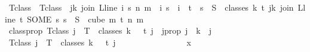\begin{isabellebody}
\ T{\isacharunderscore}{\kern0pt}class\ \ {\isachardoublequoteopen}T{\isacharunderscore}{\kern0pt}class\ {\isasymequiv}\ {\isacharparenleft}{\kern0pt}{\isasymlambda}j{\isasymin}{\isacharbraceleft}{\kern0pt}{\isachardot}{\kern0pt}{\isachardot}{\kern0pt}k{\isacharbraceright}{\kern0pt}{\isachardot}{\kern0pt}\ {\isacharbraceleft}{\kern0pt}join\ {\isacharparenleft}{\kern0pt}L{\isacharunderscore}{\kern0pt}line\ i{\isacharparenright}{\kern0pt}\ s\ n\ m\ {\isacharbar}{\kern0pt}\ i\ s\ {\isachardot}{\kern0pt}\ i\ {\isasymin}\ {\isacharbraceleft}{\kern0pt}{\isachardot}{\kern0pt}{\isachardot}{\kern0pt}{\isacharless}{\kern0pt}t{\isacharbraceright}{\kern0pt}\ {\isasymand}\ s\ {\isasymin}\ S\ {\isacharbackquote}{\kern0pt}\ {\isacharparenleft}{\kern0pt}classes\ k\ t\ j{\isacharparenright}{\kern0pt}{\isacharbraceright}{\kern0pt}{\isacharparenright}{\kern0pt}{\isacharparenleft}{\kern0pt}k{\isacharplus}{\kern0pt}{}{\isacharcolon}{\kern0pt}{\isacharequal}{\kern0pt}\ {\isacharbraceleft}{\kern0pt}join\ {\isacharparenleft}{\kern0pt}L{\isacharunderscore}{\kern0pt}line\ t{\isacharparenright}{\kern0pt}\ {\isacharparenleft}{\kern0pt}SOME\ s{\isachardot}{\kern0pt}\ s\ {\isasymin}\ S\ {\isacharbackquote}{\kern0pt}\ {\isacharparenleft}{\kern0pt}cube\ m\ {\isacharparenleft}{\kern0pt}t{\isacharplus}{\kern0pt}{}{\isacharparenright}{\kern0pt}{\isacharparenright}{\kern0pt}{\isacharparenright}{\kern0pt}\ n\ m{\isacharbraceright}{\kern0pt}{\isacharparenright}{\kern0pt}{\isachardoublequoteclose}\isanewline
\ \ \ \ \ \ \ \isanewline
\ \ \ \ \isamarkupfalse%
\ classprop{\isacharcolon}{\kern0pt}\ {\isachardoublequoteopen}T{\isacharunderscore}{\kern0pt}class\ j\ {\isacharequal}{\kern0pt}\ T\ {\isacharbackquote}{\kern0pt}\ classes\ {\isacharparenleft}{\kern0pt}k\ {\isacharplus}{\kern0pt}\ {}{\isacharparenright}{\kern0pt}\ t\ j{\isachardoublequoteclose}\ \ j{\isacharunderscore}{\kern0pt}prop{\isacharcolon}{\kern0pt}\ {\isachardoublequoteopen}j\ {\isasymle}\ k{\isachardoublequoteclose}\ \ j\isanewline
\ \ \ \ \isamarkupfalse%
\isanewline
\ \ \ \ \ \ \isamarkupfalse%
\ {\isachardoublequoteopen}T{\isacharunderscore}{\kern0pt}class\ j\ {\isasymsubseteq}\ T\ {\isacharbackquote}{\kern0pt}\ classes\ {\isacharparenleft}{\kern0pt}k\ {\isacharplus}{\kern0pt}\ {}{\isacharparenright}{\kern0pt}\ t\ j{\isachardoublequoteclose}\isanewline
\ \ \ \ \ \ \isamarkupfalse%
\isanewline
\ \ \ \ \ \ \ \ \isamarkupfalse%
\ x\ \isamarkupfalse%

\end{isabellebody}
